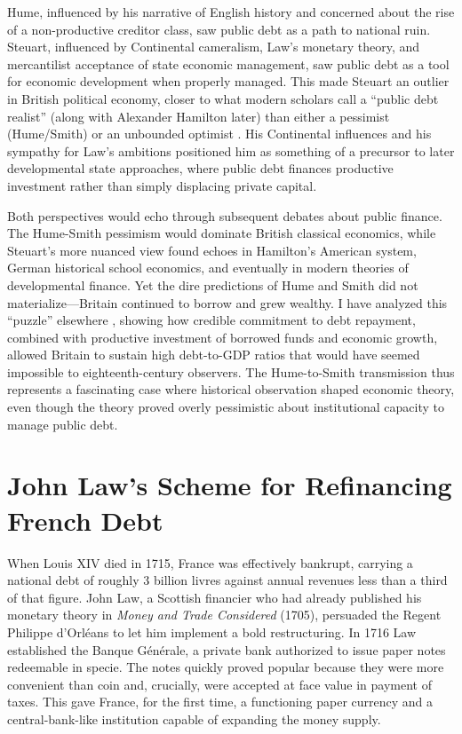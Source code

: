 \documentclass[12pt]{article}
\begin{document}
Hume, influenced by his narrative of English history and concerned about the rise of a non-productive creditor class, saw public debt as a path to national ruin. Steuart, influenced by Continental cameralism, Law's monetary theory, and mercantilist acceptance of state economic management, saw public debt as a tool for economic development when properly managed. This made Steuart an outlier in British political economy, closer to what modern scholars call a ``public debt realist'' (along with Alexander Hamilton later) than either a pessimist (Hume/Smith) or an unbounded optimist \citep{salsman2017}. His Continental influences and his sympathy for Law's ambitions positioned him as something of a precursor to later developmental state approaches, where public debt finances productive investment rather than simply displacing private capital.

Both perspectives would echo through subsequent debates about public finance. The Hume-Smith pessimism would dominate British classical economics, while Steuart's more nuanced view found echoes in Hamilton's American system, German historical school economics, and eventually in modern theories of developmental finance. Yet the dire predictions of Hume and Smith did not materialize---Britain continued to borrow and grew wealthy. I have analyzed this ``puzzle'' elsewhere \citep{sargent_velde1995}, showing how credible commitment to debt repayment, combined with productive investment of borrowed funds and economic growth, allowed Britain to sustain high debt-to-GDP ratios that would have seemed impossible to eighteenth-century observers. The Hume-to-Smith transmission thus represents a fascinating case where historical observation shaped economic theory, even though the theory proved overly pessimistic about institutional capacity to manage public debt.

\appendix

\section{John Law's Scheme for Refinancing French Debt}

When Louis XIV died in 1715, France was effectively bankrupt, carrying a national debt of roughly 3 billion livres against annual revenues less than a third of that figure. John Law, a Scottish financier who had already published his monetary theory in \textit{Money and Trade Considered} (1705), persuaded the Regent Philippe d'Orléans to let him implement a bold restructuring. In 1716 Law established the Banque Générale, a private bank authorized to issue paper notes redeemable in specie. The notes quickly proved popular because they were more convenient than coin and, crucially, were accepted at face value in payment of taxes. This gave France, for the first time, a functioning paper currency and a central-bank-like institution capable of expanding the money supply.
\end{document}
